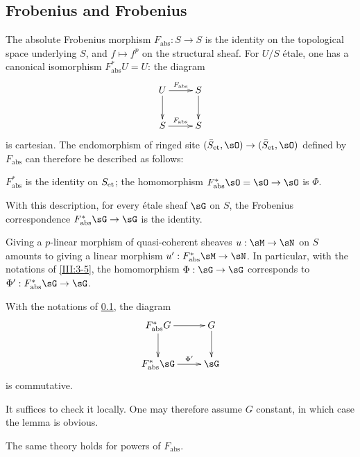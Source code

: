 \subsection{Frobenius and Frobenius}\label{III:3-4}

The absolute Frobenius morphism $F_\text{abs}:S\to S$ is the identity on
the topological space underlying $S$, and $f\mapsto f^p$ on the structural
sheaf. For $U/S$ \'etale, one has a canonical isomorphism
$F_\text{abs}^* U=U$: the diagram
\[\xymatrix{
  U \ar[r]^-{F_\text{abs}} \ar[d]
    & S \ar[d] \\
  S \ar[r]^-{F_\text{abs}}
    & S
}\]
is cartesian. The endomorphism of ringed site
$(\et{\bar S},\sO)\to(\et{\bar S},\sO)$ defined by $F_\text{abs}$ can therefore
be described as follows:
\begin{center}
  $F_\text{abs}^*$ is the identity on ${S}_{\textnormal{et}}$; the homomorphism
  $F_\text{abs}^*\sO=\sO\to\sO$ is $\Phi$.
\end{center}
With this description, for every \'etale sheaf $\sG$ on $S$, the
Frobenius correspondence $F_\text{abs}^*\sG\to\sG$ is the identity.

Giving a $p$-linear morphism of quasi-coherent sheaves
$u:\sM\to\sN$ on $S$ amounts to giving a linear morphism
$u':F_\text{abs}^*\sM\to\sN$. In particular, with the notations of
\ref{III:3-5}, the homomorphism $\Phi:\sG\to\sG$ corresponds to
$\Phi':F_\text{abs}^*\sG\to\sG$.




\begin{lemma_}\label{III:3-5}
With the notations of \ref{III:3-4}, the diagram
\[\xymatrix{
  F_\textnormal{abs}^* G \ar[r] \ar[d]
    & G \ar[d] \\
  F_\textnormal{abs}^*\sG \ar[r]^-{\Phi'}
    & \sG
}\]
is commutative.
\end{lemma_}

It suffices to check it locally. One may therefore assume $G$ constant,
in which case the lemma is obvious.

The same theory holds for powers of $F_\text{abs}$.




\subsection{}\label{III:3-6}

